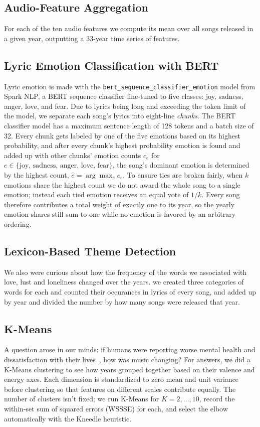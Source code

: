\documentclass[conference]{IEEEtran}
\begin{document}
\subsection{Audio-Feature Aggregation}
For each of the ten audio features we compute its mean over all songs
released in a given year, outputting a 33-year time series of features.

\subsection{Lyric Emotion Classification with BERT}
Lyric emotion is made with the \texttt{bert\_sequence\_classifier\_emotion}
model from Spark NLP, a BERT sequence classifier fine-tuned to
five classes: joy, sadness, anger, love, and fear. Due to
lyrics being long and exceeding the token limit of the model, we separate each song's lyrics
into eight-line \emph{chunks}. The BERT classifier model has a maximum sentence length of 
128 tokens and a batch size of 32. Every chunk gets labeled by one of the 
five emotions based on its highest probability, and after every chunk's
highest probability emotion is found and added up with other chunks' emotion counts $c_e$ for
$e \in \{\text{joy, sadness, anger, love, fear}\}$, the song's dominant emotion is 
determined by the highest count, $\hat{e} = \arg\max_e c_e$. To ensure ties are broken
fairly, when $k$ emotions share the highest count we do not award the whole song to a
single emotion; instead each tied emotion receives an equal vote of $1/k$. Every song
therefore contributes a total weight of exactly one to its year, so the yearly emotion
shares still sum to one while no emotion is favored by an arbitrary ordering.

\subsection{Lexicon-Based Theme Detection}
We also were curious about how the frequency of the words we associated with
 love, lust and loneliness changed over the years. we created three categories 
 of words for each and counted their occurances in lyrics of every song, and added
 up by year and divided the number by how many songs were released that year.

\subsection{K-Means}
A question arose in our minds: if humans were reporting worse mental health
and dissatisfaction with their lives~\cite{b_mentalhealth}, how was music changing? For
answers, we did a K-Means clustering to see how years grouped together based
on their valence and energy axes. Each dimension is standardized to zero mean and unit
variance before clustering so that features on different scales contribute
equally. The number of clusters isn't fixed; we run K-Means for
$K = 2,\dots,10$, record the within-set sum of squared errors (WSSSE) for each,
and select the elbow automatically with the Kneedle heuristic.
\end{document}

